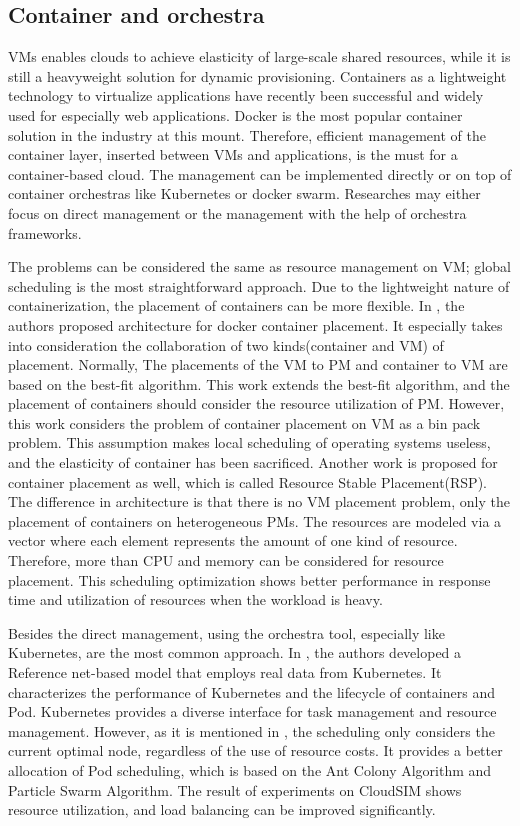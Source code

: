 \documentclass[sigchi]{acmart}
\begin{document}
\subsection{Container and orchestra}
VMs enables clouds to achieve elasticity of large-scale shared resources, while it is still a heavyweight solution for dynamic provisioning.
Containers as a lightweight technology to virtualize applications have recently been successful and widely used for especially web applications.
Docker is the most popular container solution in the industry at this mount. Therefore, efficient management of the container layer, inserted between VMs and applications, is the must for a container-based cloud.
The management can be implemented directly or on top of container orchestras like Kubernetes or docker swarm.
Researches may either focus on direct management or the management with the help of orchestra frameworks.

The problems can be considered the same as resource management on VM; global scheduling is the most straightforward approach.
Due to the lightweight nature of containerization, the placement of containers can be more flexible.
In \cite{zhang2018container}, the authors proposed architecture for docker container placement.
It especially takes into consideration the collaboration of two kinds(container and VM) of placement.
Normally, The placements of the VM to PM and container to VM are based on the best-fit algorithm.
This work extends the best-fit algorithm, and the placement of containers should consider the resource utilization of PM.
However, this work considers the problem of container placement on VM as a bin pack problem. This assumption makes local scheduling of operating systems useless, and the elasticity of container has been sacrificed.
Another work\cite{7023588} is proposed for container placement as well, which is called Resource Stable Placement(RSP). The difference in architecture is that there is no VM placement problem, only the placement of containers on heterogeneous PMs.
The resources are modeled via a vector where each element represents the amount of one kind of resource.
Therefore, more than CPU and memory can be considered for resource placement.
This scheduling optimization shows better performance in response time and utilization of resources when the workload is heavy.

Besides the direct management, using the orchestra tool, especially like Kubernetes, are the most common approach.
In \cite{medel2016modelling}, the authors developed a Reference net-based model that employs real data from Kubernetes.
It characterizes the performance of Kubernetes and the lifecycle of containers and Pod. 
Kubernetes provides a diverse interface for task management and resource management.
However, as it is mentioned in \cite{wei2018research}, the scheduling only considers the current optimal node, regardless of the use of resource costs.
It provides a better allocation of  Pod scheduling, which is based on the Ant Colony Algorithm and Particle Swarm Algorithm.
The result of experiments on CloudSIM shows resource utilization, and load balancing can be improved significantly.


\newpage  


\end{document}
